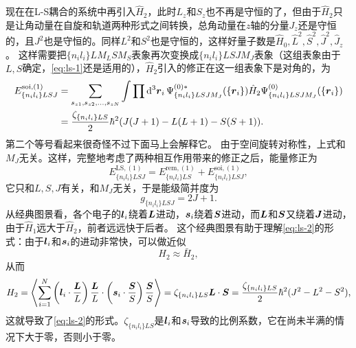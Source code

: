 现在在L-S耦合的系统中再引入$\hat{H}_2$，此时$L_z$和$S_z$也不再是守恒的了，但由于$\hat{H}_2$只是让角动量在自旋和轨道两种形式之间转换，总角动量在$z$轴的分量$J_z$还是守恒的，且$J^2$也是守恒的。同样$L^2$和$S^2$也是守恒的，这样好量子数是$\hat{H}_0, \hat{L}^2, \hat{S}^2, \hat{J}^2, \hat{J}_z$。
这样需要把$\{n_i l_i\} L M_L S M_S$表象再次变换成$\{n_i l_i\} L S J M_J$表象（这组表象由于$L,S$确定，\eqref{eq:ls-1}还是适用的），$\hat{H}_2$引入的修正在这一组表象下是对角的，为
\begin{equation}
    \begin{aligned}
        E^{\text{soi}, (1)}_{\{n_i l_i\} LSJ} &= \sum_{s_{z1}, s_{z2}, \ldots, s_{zN}} \int \prod \dd[3]{\vb*{r}_i} \Psi^{(0) *}_{\{n_i l_i\} L S J M_J}(\{\vb*{r}_i\}) \hat{H}_2 \Psi^{(0)}_{\{n_i l_i\} L S J M_J}(\{\vb*{r}_i\}) \\
        &= \frac{\zeta_{\{n_i l_i\}LS}}{2} \hbar^2 (J(J+1) - L(L+1) - S(S+1)).
        \label{eq:ls-2}
    \end{aligned}
\end{equation}
第二个等号看起来很奇怪不过下面马上会解释它。
由于空间旋转对称性，上式和$M_J$无关。这样，完整地考虑了两种相互作用带来的修正之后，能量修正为
\begin{equation}
    E^{\text{LS}, (1)}_{\{n_i l_i\} LSJ} = E^{\text{rem}, (1)}_{\{n_i l_i\} LS} + E^{\text{soi}, (1)}_{\{n_i l_i\} LSJ},
\end{equation}
它只和$L,S,J$有关，和$M_J$无关，于是能级简并度为
\begin{equation}
    g_{\{n_i l_i\}LSJ} = 2J + 1.
\end{equation}
从经典图景看，各个电子的$\vb*{l}_i$绕着$\vb*{L}$进动，$\vb*{s}_i$绕着$\vb*{S}$进动，而$\vb*{L}$和$\vb*{S}$又绕着$\vb*{J}$进动，由于$\hat{H}_1$远大于$\hat{H}_2$，前者远远快于后者。
这个经典图景有助于理解\eqref{eq:ls-2}的形式：由于$\vb*{l}_i$和$\vb*{s}_i$的进动非常快，可以做近似
\[
    H_2 \approx \bar{H}_2,
\]
从而
\[
    H_2 = \expval{\sum_{i=1}^N \left(\vb*{l}_i \cdot \frac{\vb*{L}}{L} \right) \frac{\vb*{L}}{L} \cdot \left(\vb*{s}_i \cdot \frac{\vb*{S}}{S} \right) \frac{\vb*{S}}{S} } = \zeta_{\{n_i l_i\}LS} \vb*{L} \cdot \vb*{S} = \frac{\zeta_{\{n_i l_i\}LS}}{2} \hbar^2 (J^2 - L^2 - S^2),
\]
这就导致了\eqref{eq:ls-2}的形式。$\zeta_{\{n_i l_i\}LS}$是$\vb*{l}_i$和$\vb*{s}_i$导致的比例系数，它在尚未半满的情况下大于零，否则小于零。

